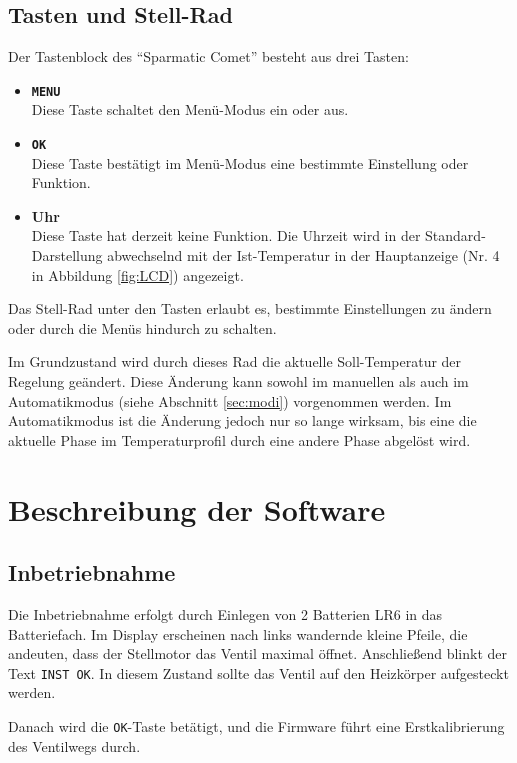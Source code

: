 \documentclass[a5paper]{article}
\newcommand\SC{"`Sparmatic Comet"'}
\begin{document}
\subsection {
  Tasten und Stell-Rad
}

Der Tastenblock des \SC{} besteht aus drei Tasten:

\begin{itemize}
\item \textbf{\texttt{MENU}}\\ Diese Taste schaltet den Menü-Modus ein oder aus.
\item \textbf{\texttt{OK}}\\ Diese Taste bestätigt im Menü-Modus eine bestimmte
  Einstellung oder Funktion.
\item \textbf{Uhr}\\ Diese Taste hat derzeit keine Funktion.  Die Uhrzeit wird
  in der Standard-Darstellung abwechselnd mit der Ist-Temperatur in der
  Hauptanzeige (Nr. 4 in Abbildung \ref{fig:LCD}) angezeigt.
\end{itemize}

Das Stell-Rad unter den Tasten erlaubt es, bestimmte Einstellungen zu
ändern oder durch die Menüs hindurch zu schalten.

Im Grundzustand wird durch dieses Rad die aktuelle Soll-Temperatur
der Regelung geändert.  Diese Änderung kann sowohl im manuellen als
auch im Automatikmodus (siehe Abschnitt \ref{sec:modi}) vorgenommen
werden.  Im Automatikmodus ist die Änderung jedoch nur so lange
wirksam, bis eine die aktuelle Phase im Temperaturprofil durch eine
andere Phase abgelöst wird.

\section {
  Beschreibung der Software
}

\subsection {
  Inbetriebnahme
}

Die Inbetriebnahme erfolgt durch Einlegen von 2 Batterien LR6 in das
Batteriefach.  Im Display erscheinen nach links wandernde kleine
Pfeile, die andeuten, dass der Stellmotor das Ventil maximal öffnet.
Anschließend blinkt der Text \texttt{INST OK}.  In diesem Zustand sollte
das Ventil auf den Heizkörper aufgesteckt werden.

Danach wird die \texttt{OK}-Taste betätigt, und die Firmware führt eine
Erstkalibrierung des Ventilwegs durch.
\end{document}
